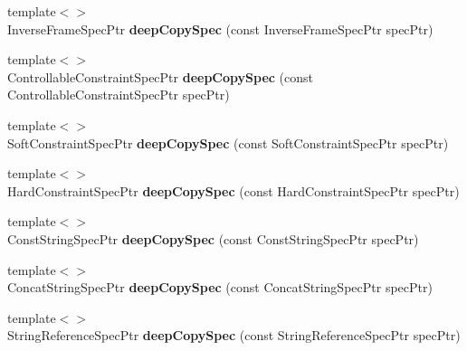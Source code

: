 \begin{DoxyCompactItemize}
\item 
\hypertarget{namespacegiskard__suturo_a489e18ee233753c533d784ae56de1855}{{\footnotesize template$<$$>$ }\\Inverse\-Frame\-Spec\-Ptr {\bfseries deep\-Copy\-Spec} (const Inverse\-Frame\-Spec\-Ptr spec\-Ptr)}\label{namespacegiskard__suturo_a489e18ee233753c533d784ae56de1855}

\item 
\hypertarget{namespacegiskard__suturo_aee8f38df8ce00c994b5d9c6c5e5f0489}{{\footnotesize template$<$$>$ }\\Controllable\-Constraint\-Spec\-Ptr {\bfseries deep\-Copy\-Spec} (const Controllable\-Constraint\-Spec\-Ptr spec\-Ptr)}\label{namespacegiskard__suturo_aee8f38df8ce00c994b5d9c6c5e5f0489}

\item 
\hypertarget{namespacegiskard__suturo_a32aafa8ae20af750a44cfc91482c1a08}{{\footnotesize template$<$$>$ }\\Soft\-Constraint\-Spec\-Ptr {\bfseries deep\-Copy\-Spec} (const Soft\-Constraint\-Spec\-Ptr spec\-Ptr)}\label{namespacegiskard__suturo_a32aafa8ae20af750a44cfc91482c1a08}

\item 
\hypertarget{namespacegiskard__suturo_a4f6c69c1d86a4e0afd72ff368d87c792}{{\footnotesize template$<$$>$ }\\Hard\-Constraint\-Spec\-Ptr {\bfseries deep\-Copy\-Spec} (const Hard\-Constraint\-Spec\-Ptr spec\-Ptr)}\label{namespacegiskard__suturo_a4f6c69c1d86a4e0afd72ff368d87c792}

\item 
\hypertarget{namespacegiskard__suturo_a6b24d5756aee191e164801bfa974c45c}{{\footnotesize template$<$$>$ }\\Const\-String\-Spec\-Ptr {\bfseries deep\-Copy\-Spec} (const Const\-String\-Spec\-Ptr spec\-Ptr)}\label{namespacegiskard__suturo_a6b24d5756aee191e164801bfa974c45c}

\item 
\hypertarget{namespacegiskard__suturo_a70d2b3b7d1fa510186f3fd534777d547}{{\footnotesize template$<$$>$ }\\Concat\-String\-Spec\-Ptr {\bfseries deep\-Copy\-Spec} (const Concat\-String\-Spec\-Ptr spec\-Ptr)}\label{namespacegiskard__suturo_a70d2b3b7d1fa510186f3fd534777d547}

\item 
\hypertarget{namespacegiskard__suturo_abbde04843e8dbd882bf806cd72be79b0}{{\footnotesize template$<$$>$ }\\String\-Reference\-Spec\-Ptr {\bfseries deep\-Copy\-Spec} (const String\-Reference\-Spec\-Ptr spec\-Ptr)}\label{namespacegiskard__suturo_abbde04843e8dbd882bf806cd72be79b0}


\end{DoxyCompactItemize}
